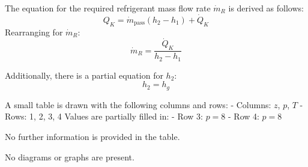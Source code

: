 The equation for the required refrigerant mass flow rate \( \dot{m}_R \) is derived as follows:  
\[
Q_K = \dot{m}_{\text{pass}} (h_2 - h_1) + \dot{Q}_K
\]  
Rearranging for \( \dot{m}_R \):  
\[
\dot{m}_R = \frac{\dot{Q}_K}{h_2 - h_1}
\]  

Additionally, there is a partial equation for \( h_2 \):  
\[
h_2 = h_g
\]  

A small table is drawn with the following columns and rows:  
- Columns: \( z \), \( p \), \( T \)  
- Rows: 1, 2, 3, 4  
Values are partially filled in:  
- Row 3: \( p = 8 \)  
- Row 4: \( p = 8 \)  

No further information is provided in the table.  

No diagrams or graphs are present.